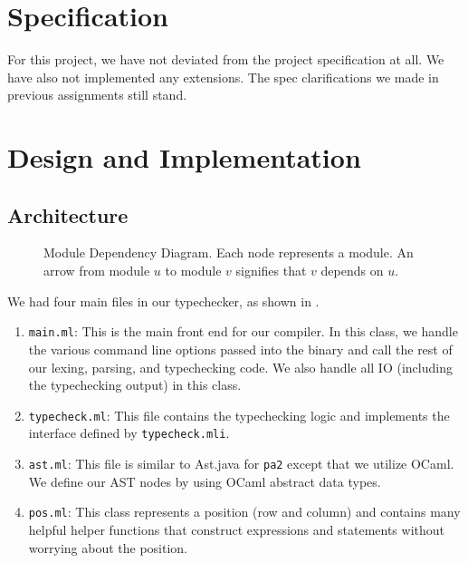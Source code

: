\documentclass{hw}
\begin{document}
\section{Specification}\label{sec:specification}
For this project, we have not deviated from the project specification at all.
We have also not implemented any extensions. The spec clarifications we made in
previous assignments still stand.

\section{Design and Implementation}\label{sec:design}
\subsection{Architecture}
\begin{figure}[h]
  \centering
  \caption{%
    Module Dependency Diagram. Each node represents a module. An arrow from
    module $u$ to module $v$ signifies that $v$ depends on $u$.
  }
  \label{fig:mdd}
\end{figure}

We had four main files in our typechecker, as shown in .
\begin{enumerate}
  \item{\texttt{main.ml}:}
    This is the main front end for our compiler. In this class, we handle the
    various command line options passed into the binary and call the rest of
    our lexing, parsing, and typechecking code. We also handle all IO (including the typechecking
    output) in this class.

  \item{\texttt{typecheck.ml}:}
    This file contains the typechecking logic and implements the interface defined by \texttt{typecheck.mli}.

  \item{\texttt{ast.ml}:}
    This file is similar to Ast.java for \texttt{pa2} except that we utilize OCaml. We define our AST nodes by using OCaml abstract data types.

  \item{\texttt{pos.ml}:}
    This class represents a position (row and column) and contains many helpful helper functions that construct expressions and statements without worrying about the position.

\end{enumerate}
\end{document}
